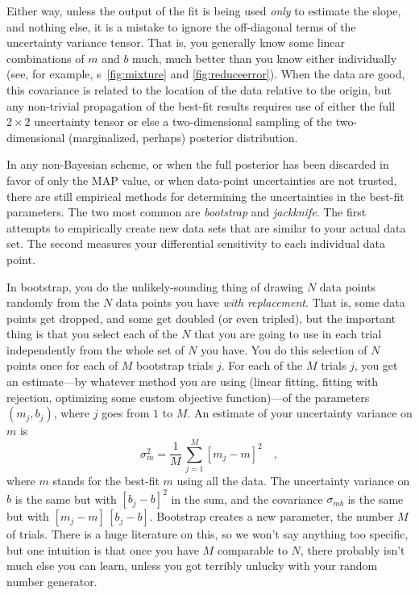 \documentclass[12pt,twoside,pdftex]{article}
\newcommand{\figurenames}{\figurename s}
\begin{document}
Either way, unless the output of the fit is being used \emph{only} to
estimate the slope, and nothing else, it is a mistake to ignore the
off-diagonal terms of the uncertainty variance tensor.  That is, you
generally know some linear combinations of $m$ and $b$ much, much
better than you know either individually (see, for example,
\figurenames~\ref{fig:mixture} and \ref{fig:reduceerror}).  When the
data are good, this covariance is related to the location of the data
relative to the origin, but any non-trivial propagation of the
best-fit results requires use of either the full $2\times 2$
uncertainty tensor or else a two-dimensional sampling of the
two-dimensional (marginalized, perhaps) posterior distribution.

In any non-Bayesian scheme, or when the full posterior has been
discarded in favor of only the MAP value, or when data-point
uncertainties are not trusted, there are still empirical methods for
determining the uncertainties in the best-fit parameters.  The two
most common are \emph{bootstrap} and \emph{jackknife}.  The first
attempts to empirically create new data sets that are similar to your
actual data set.  The second measures your differential sensitivity to
each individual data point.

In bootstrap, you do the unlikely-sounding thing of drawing $N$ data
points randomly from the $N$ data points you have \emph{with
  replacement}.  That is, some data points get dropped, and some get
doubled (or even tripled), but the important thing is that you select
each of the $N$ that you are going to use in each trial independently
from the whole set of $N$ you have.  You do this selection of $N$
points once for each of $M$ bootstrap trials $j$.  For each of the $M$
trials $j$, you get an estimate---by whatever method you are using
(linear fitting, fitting with rejection, optimizing some custom
objective function)---of the parameters $(m_j,b_j)$, where $j$ goes
from $1$ to $M$.  An estimate of your uncertainty variance on $m$ is
\begin{equation}
\sigma_m^2 = \frac{1}{M}\,\sum_{j=1}^M [m_j-m]^2 \quad ,
\end{equation}
where $m$ stands for the best-fit $m$ using all the data.  The
uncertainty variance on $b$ is the same but with $[b_j-b]^2$ in the
sum, and the covariance $\sigma_{mb}$ is the same but with
$[m_j-m]\,[b_j-b]$.   Bootstrap
creates a new parameter, the number $M$ of trials.  There is a huge
literature on this, so we won't say anything too specific, but one
intuition is that once you have $M$ comparable to $N$, there probably
isn't much else you can learn, unless you got terribly unlucky with
your random number generator.
\end{document}
